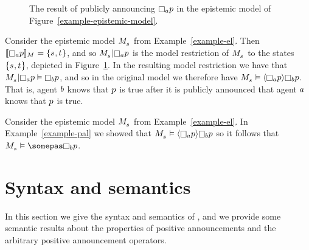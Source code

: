 \begin{example}\label{example-pal}
    \begin{figure}
        \caption{The result of publicly announcing $\knows[\agentA] \atomP$ in the epistemic model of Figure~\ref{example-epistemic-model}.}\label{example-public-announcement}
        \centering
    \end{figure}
    Consider the epistemic model $\kPModel{\kStateS}$ from Example~\ref{example-el}.
    Then $\interpretation[\kModel]{\knows[\agentA] \atomP} = \{\kStateS, \kStateT\}$,
    and so $\restrict{\kPModel{\kStateS}}{\knows[\agentA] \atomP}$ 
    is the model restriction of $\kPModel{\kStateS}$ 
    to the states $\{\kStateS, \kStateT\}$, depicted in Figure~\ref{example-public-announcement}.  
    In the resulting model restriction we have that
    $\restrict{\kPModel{\kStateS}}{\knows[\agentA] \atomP} \entails \knows[\agentB] \atomP$,
    and so in the original model we therefore have
    $\kPModel{\kStateS} \entails \announceE{\knows[\agentA] \atomP} \knows[\agentB] \atomP$.
    That is, agent $b$ knows that $p$ is true after it is publicly
    announced that agent $a$ knows that $p$ is true.
\end{example}

\begin{example}\label{example-apal}
    Consider the epistemic model $\kPModel{\kStateS}$ from Example~\ref{example-el}.
    In Example~\ref{example-pal} we showed that 
    $\kPModel{\kStateS} \entails \announceE{\knows[\agentA] \atomP} \knows[\agentB] \atomP$
    so it follows that
    $\kPModel{\kStateS} \entails \somepas \knows[\agentB] \atomP$.
\end{example}


\section{Syntax and semantics}\label{syntax-semantics}

In this section we give the syntax and semantics of \logicPapalS{}, and we provide some semantic results about the properties of positive announcements and the arbitrary positive announcement operators.

